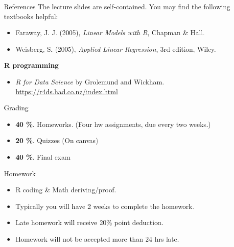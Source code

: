 \documentclass[10pt]{beamer}
\begin{document}
\begin{frame}{References}
\large
 The lecture slides are self-contained. You may find the following textbooks helpful:

\begin{itemize}
\item Faraway, J. J. (2005),\textit{ Linear Models with R}, Chapman \& Hall.
\item Weisberg, S. (2005),\textit{ Applied Linear Regression}, 3rd edition, Wiley.
\end{itemize}  

\vspace{0.05in}

{\bf R programming}
\begin{itemize}
\item \textit{R for Data Science} by Grolemund and Wickham.    \url{https://r4ds.had.co.nz/index.html}
\end{itemize}
\end{frame}

\begin{frame}{Grading}
\large
\begin{itemize}
   \item {\bf 40 \%}. Homeworks. (Four hw assignments, due every two weeks.)
   \item {\bf 20 \%}. Quizzes (On canvas)
   \item {\bf 40 \%}. Final exam
\end{itemize}
    
\end{frame}

\begin{frame}{Homework}

\begin{itemize}
\large
   \item R coding \& Math deriving/proof.
   \item Typically you will have 2 weeks to complete the homework.
   \item Late homework will receive 20\% point deduction.
   \item Homework will not be accepted more than 24 hrs late.
\end{itemize}
    
\end{frame}
\end{document}
